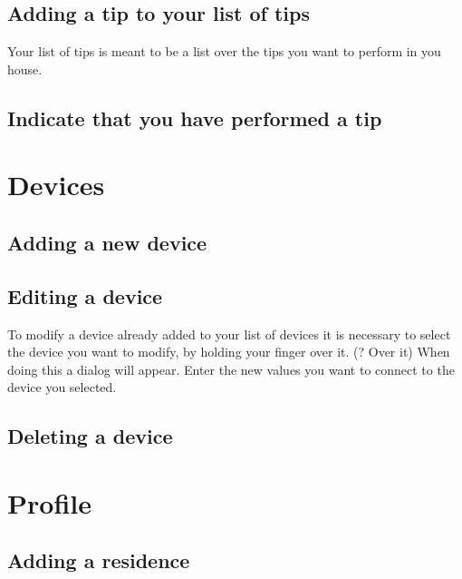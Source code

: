 \subsection{Adding a tip to your list of tips}
Your list of tips is meant to be a list over the tips you want to perform in you house. 
\subsection{Indicate that you have performed a tip}

\section{Devices}
\subsection{Adding a new device}
\subsection{Editing a device}
To modify a device already added to your list of devices it is necessary to select the device you want to modify, by holding your finger over it. (? Over it) When doing this a dialog will appear. Enter the new values you want to connect to the device you selected. 
\subsection{Deleting a device}

\section{Profile}
\subsection{Adding a residence}
